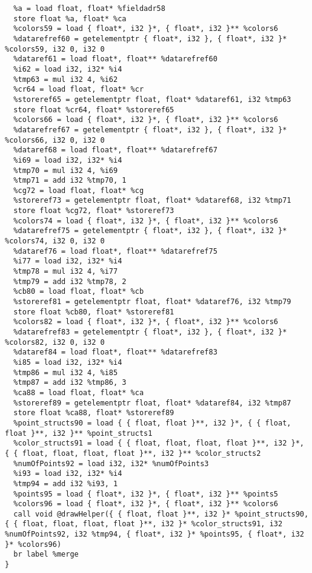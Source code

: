 \documentclass[main.tex]{subfiles}
\begin{document}
{\begin{lstlisting}
  %a = load float, float* %fieldadr58
  store float %a, float* %ca
  %colors59 = load { float*, i32 }*, { float*, i32 }** %colors6
  %datarefref60 = getelementptr { float*, i32 }, { float*, i32 }* %colors59, i32 0, i32 0
  %dataref61 = load float*, float** %datarefref60
  %i62 = load i32, i32* %i4
  %tmp63 = mul i32 4, %i62
  %cr64 = load float, float* %cr
  %storeref65 = getelementptr float, float* %dataref61, i32 %tmp63
  store float %cr64, float* %storeref65
  %colors66 = load { float*, i32 }*, { float*, i32 }** %colors6
  %datarefref67 = getelementptr { float*, i32 }, { float*, i32 }* %colors66, i32 0, i32 0
  %dataref68 = load float*, float** %datarefref67
  %i69 = load i32, i32* %i4
  %tmp70 = mul i32 4, %i69
  %tmp71 = add i32 %tmp70, 1
  %cg72 = load float, float* %cg
  %storeref73 = getelementptr float, float* %dataref68, i32 %tmp71
  store float %cg72, float* %storeref73
  %colors74 = load { float*, i32 }*, { float*, i32 }** %colors6
  %datarefref75 = getelementptr { float*, i32 }, { float*, i32 }* %colors74, i32 0, i32 0
  %dataref76 = load float*, float** %datarefref75
  %i77 = load i32, i32* %i4
  %tmp78 = mul i32 4, %i77
  %tmp79 = add i32 %tmp78, 2
  %cb80 = load float, float* %cb
  %storeref81 = getelementptr float, float* %dataref76, i32 %tmp79
  store float %cb80, float* %storeref81
  %colors82 = load { float*, i32 }*, { float*, i32 }** %colors6
  %datarefref83 = getelementptr { float*, i32 }, { float*, i32 }* %colors82, i32 0, i32 0
  %dataref84 = load float*, float** %datarefref83
  %i85 = load i32, i32* %i4
  %tmp86 = mul i32 4, %i85
  %tmp87 = add i32 %tmp86, 3
  %ca88 = load float, float* %ca
  %storeref89 = getelementptr float, float* %dataref84, i32 %tmp87
  store float %ca88, float* %storeref89
  %point_structs90 = load { { float, float }**, i32 }*, { { float, float }**, i32 }** %point_structs1
  %color_structs91 = load { { float, float, float, float }**, i32 }*, { { float, float, float, float }**, i32 }** %color_structs2
  %numOfPoints92 = load i32, i32* %numOfPoints3
  %i93 = load i32, i32* %i4
  %tmp94 = add i32 %i93, 1
  %points95 = load { float*, i32 }*, { float*, i32 }** %points5
  %colors96 = load { float*, i32 }*, { float*, i32 }** %colors6
  call void @drawHelper({ { float, float }**, i32 }* %point_structs90, { { float, float, float, float }**, i32 }* %color_structs91, i32 %numOfPoints92, i32 %tmp94, { float*, i32 }* %points95, { float*, i32 }* %colors96)
  br label %merge
}


\end{lstlisting}}
\end{document}
